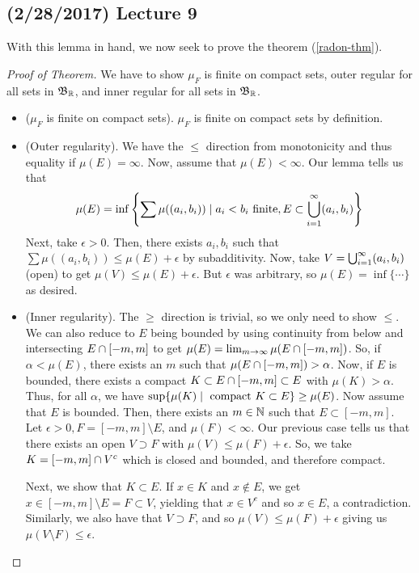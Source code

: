 \documentclass[11pt,leqno,oneside]{amsbook}
\numberwithin{thm}{section}
\begin{document}
  \subsection*{(2/28/2017) Lecture 9}
  With this lemma in hand, we now seek to prove the theorem (\ref{radon-thm}).
  \begin{proof}[Proof of Theorem]
    We have to show $\mu_F$ is finite on compact sets, outer
    regular for all sets in $\mathfrak{B}_{\mathbb R}$, and inner regular for all sets in
    $\mathfrak{B}_{\mathbb R}$.
    \begin{itemize}
    \item ($\mu_F$ is finite on compact sets).
      $\mu_F$ is finite on compact sets by definition.
    \item (Outer regularity). We have the $\leq$ direction from
      monotonicity and thus equality if $\mu(E) = \infty$. Now, assume
      that $\mu(E) < \infty$. Our lemma tells us that \[
        \mu(E) = \inf \left\{ \sum \mu((a_i,b_i)) \mid a_i < b_i
          \text{ finite}, E \subset \bigcup_{i=1}^\infty (a_i,b_i) \right\}
      \]
      Next, take $\epsilon > 0$. Then, there exists $a_i,b_i$ such
      that $\sum \mu((a_i,b_i)) \leq \mu(E) +\epsilon$ by
      subadditivity. Now, take $V = \bigcup_{i=1}^\infty (a_i,b_i)$
      (open) to get $\mu(V) \leq \mu(E) + \epsilon$. But $\epsilon$
      was arbitrary, so $\mu(E) = \inf\{ \cdots \}$ as desired.
    \item (Inner regularity). The $\geq$ direction is trivial, so we
      only need to show $\leq$. We can also reduce to $E$ being
      bounded by using continuity from below and intersecting $E
      \cap [-m,m]$ to get $\mu(E) = \lim_{m \to \infty} \mu(E
      \cap [-m,m])$. So, if $\alpha < \mu(E)$, there exists an
      $m$ such that $\mu(E \cap [-m,m]) > \alpha$. Now, if $E$
      is bounded, there exists a
      compact $K \subset E \cap [-m,m] \subset E$ with $\mu(K) >
      \alpha$. Thus, for all $\alpha$, we have $\sup \{\mu(K)
      \mid \text{ compact }K \subset E\} \geq \mu(E)$. Now assume that
      $E$ is bounded. Then, there exists an $m \in {\mathbb N}$ such that $E
      \subset [-m,m]$. Let $\epsilon > 0, F = [-m,m] \setminus E$, and
      $\mu(F) < \infty$. Our previous case tells us that there exists
      an open $V \supset F$  with $\mu(V) \leq \mu(F) + \epsilon$. So,
      we take $K = [-m,m] \cap V^c$ which is closed and bounded,
      and therefore compact.

      Next, we show that $K
      \subset E$. If $x \in K$ and $x \not \in E$, we get $x \in
      [-m,m] \setminus E = F \subset V$, yielding that $x \in V^c$ and
      so $x \in E$, a contradiction. Similarly, we also have that $V
      \supset F$, and so $\mu(V) \leq \mu(F) + \epsilon$ giving us
      $\mu(V \setminus F) \leq \epsilon$.


\end{itemize}
\end{proof}
\end{document}
